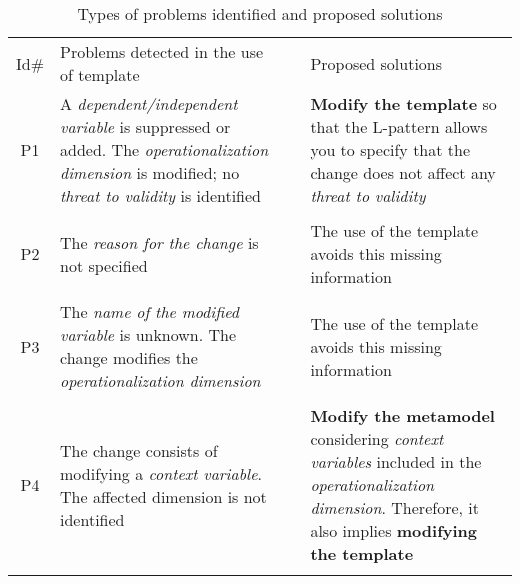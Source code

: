 
\begin{table}[h]
  \caption{Types of problems identified and proposed solutions}
  \label{tab:tipos}
  \centering
	\scriptsize
\begin{tabularx}{0.9\textwidth}{c
  >{\hsize=0.88\hsize}X
  >{\hsize=0.02\hsize}X
  >{\hsize=1.10\hsize}X}
  
	\hline\noalign{\smallskip}
		
    
    Id\# & 
    Problems detected in the use of template &  &
    Proposed solutions \\

	\noalign{\smallskip}\hline\noalign{\smallskip}
	P1 & A \emph{dependent/independent variable} is suppressed or added. The \emph{operationalization dimension} is modified; no \emph{threat to validity} is identified & & \textbf{Modify the template} so that the L-pattern allows you to specify that the change does not affect any \emph{threat to validity} \\ \\

    P2 & The  \emph{reason for the change}  is not specified  & &
    The use of the template avoids this missing information \\ \\
    
    P3 & The  \emph{name of the modified variable} is unknown. The change modifies the  \emph{operationalization dimension}  & &
    The use of the template avoids this missing information \\ \\
	
	P4 & The change consists of modifying a \emph{context variable}. The affected dimension is not identified  & &
	\textbf{Modify the metamodel} considering \emph{context variables} included in the \emph{operationalization dimension}. Therefore, it also implies \textbf{modifying the template} \\ 

	\noalign{\smallskip\smallskip}\hline
	\end{tabularx}  
\end{table}

